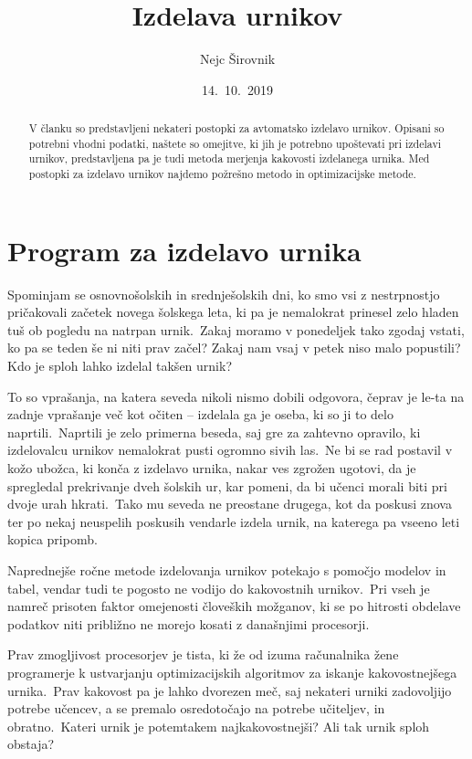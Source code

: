 \documentclass[a4paper,10pt]{article}
\title{Izdelava urnikov}
\author{Nejc Širovnik}
\date{14.\ 10.\ 2019}
\begin{document}
\maketitle

\begin{abstract}
V članku so predstavljeni nekateri postopki za avtomatsko izdelavo urnikov.
Opisani so potrebni vhodni podatki, naštete so omejitve, ki jih je potrebno
upoštevati pri izdelavi urnikov, predstavljena pa je tudi metoda merjenja
kakovosti izdelanega urnika.
Med postopki za izdelavo urnikov najdemo požrešno metodo in optimizacijske metode.
\end{abstract}


\section{Program za izdelavo urnika}

Spominjam se osnovnošolskih in srednješolskih dni, ko smo vsi z nestrpnostjo pričakovali
začetek novega šolskega leta, ki pa je nemalokrat prinesel zelo hladen tuš ob pogledu na
natrpan urnik.\ Zakaj moramo v ponedeljek tako zgodaj vstati, ko pa se teden še ni niti
prav začel? Zakaj nam vsaj v petek niso malo popustili? Kdo je sploh lahko izdelal
takšen urnik?

To so vprašanja, na katera seveda nikoli nismo dobili odgovora, čeprav je le-ta na zadnje
vprašanje več kot očiten -- izdelala ga je oseba, ki so ji to delo naprtili.\ Naprtili je
zelo primerna beseda, saj gre za zahtevno opravilo, ki izdelovalcu urnikov nemalokrat
pusti ogromno sivih las.\ Ne bi se rad postavil v kožo ubožca, ki konča z izdelavo urnika,
nakar ves zgrožen ugotovi, da je spregledal prekrivanje dveh šolskih ur, kar pomeni, da
bi učenci morali biti pri dvoje urah hkrati.\ Tako mu seveda ne preostane drugega, kot da
poskusi znova ter po nekaj neuspelih poskusih vendarle izdela urnik, na katerega pa vseeno
leti kopica pripomb.

Naprednejše ročne metode izdelovanja urnikov potekajo s pomočjo modelov in tabel, vendar
tudi te pogosto ne vodijo do kakovostnih urnikov.\ Pri vseh je namreč prisoten faktor
omejenosti človeških možganov, ki se po hitrosti obdelave podatkov niti približno ne
morejo kosati z današnjimi procesorji.

Prav zmogljivost procesorjev je tista, ki že od izuma računalnika žene programerje k
ustvarjanju optimizacijskih algoritmov za iskanje kakovostnejšega urnika.\ Prav kakovost
pa je lahko dvorezen meč, saj nekateri urniki zadovoljijo potrebe učencev, a se premalo
osredotočajo na potrebe učiteljev, in obratno.\ Kateri urnik je potemtakem najkakovostnejši?
Ali tak urnik sploh obstaja?
\end{document}
